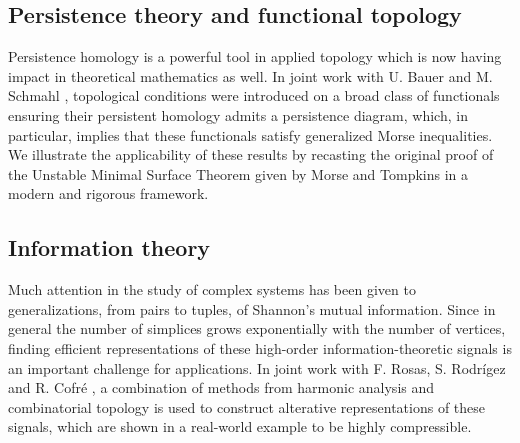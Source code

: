 \subsection{Persistence theory and functional topology}

Persistence homology is a powerful tool in applied topology which is now having impact in theoretical mathematics as well.
In joint work with U. Bauer and M. Schmahl \cite{medina2022fuct_top}, topological conditions were introduced on a broad class of functionals ensuring their persistent homology admits a persistence diagram, which, in particular, implies that these functionals satisfy generalized Morse inequalities.
We illustrate the applicability of these results by recasting the original proof of the Unstable Minimal Surface Theorem given by Morse and Tompkins in a modern and rigorous framework.

\subsection{Information theory}

Much attention in the study of complex systems has been given to generalizations, from pairs to tuples, of Shannon's mutual information.
Since in general the number of simplices grows exponentially with the number of vertices, finding efficient representations of these high-order information-theoretic signals is an important challenge for applications.
In joint work with F. Rosas, S. Rodr\'igez and R. Cofr\'e  \cite{medina2021hyperharmonic}, a combination of methods from harmonic analysis and combinatorial topology is used to construct alterative representations of these signals, which are shown in a real-world example to be highly compressible.